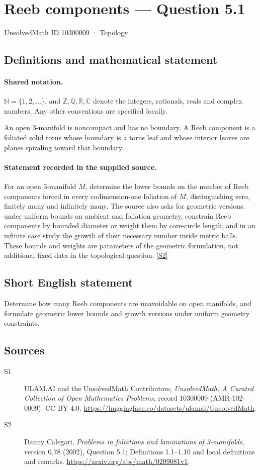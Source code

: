 \documentclass[11pt]{article}
\newcommand{\sref}[2]{\hyperlink{source:#1:#2}{[S#2]}}
\begin{document}
\setcounter{section}{10300008}
\section{Reeb components — Question 5.1}\label{10300009}
{\small\sffamily UnsolvedMath ID 10300009 · Topology}
\subsection{Definitions and mathematical statement}

\paragraph{Shared notation.}$\mathbb N=\{1,2,\ldots\}$, and $\mathbb Z,\mathbb Q,\mathbb R,\mathbb C$ denote the integers, rationals, reals and complex numbers. Any other conventions are specified locally.


An open $3$-manifold is noncompact and has no boundary. A Reeb component is a foliated solid torus whose boundary is a torus leaf and whose interior leaves are planes spiraling toward that boundary.
\paragraph{Statement recorded in the supplied source.}
For an open $3$-manifold $M$, determine the lower bounds on the number of Reeb components forced in every codimension-one foliation of $M$, distinguishing zero, finitely many and infinitely many. The source also asks for geometric versions: under uniform bounds on ambient and foliation geometry, constrain Reeb components by bounded diameter or weight them by core-circle length, and in an infinite case study the growth of their necessary number inside metric balls. These bounds and weights are parameters of the geometric formulation, not additional fixed data in the topological question. \sref{10300009}{2}
\subsection{Short English statement}
Determine how many Reeb components are unavoidable on open manifolds, and formulate geometric lower bounds and growth versions under uniform geometry constraints.
\subsection{Sources}
\begin{description}
\item[\hypertarget{source:10300009:1}{S1}] ULAM.AI and the UnsolvedMath Contributors, \emph{UnsolvedMath: A Curated Collection of Open Mathematics Problems}, record 10300009 (AMR-102-0009). CC BY 4.0. \url{https://huggingface.co/datasets/ulamai/UnsolvedMath}.
\item[\hypertarget{source:10300009:2}{S2}] Danny Calegari, \emph{Problems in foliations and laminations of 3-manifolds}, version 0.78 (2002), Question 5.1; Definitions 1.1--1.10 and local definitions and remarks. \url{https://arxiv.org/abs/math/0209081v1}.
\end{description}
\label{end:10300009}
\end{document}
